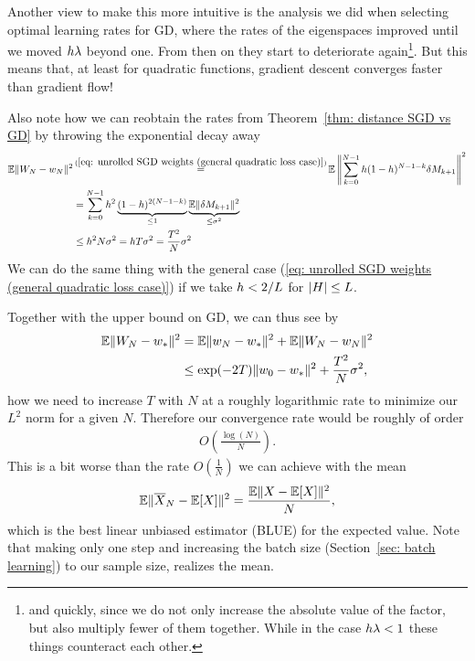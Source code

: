 Another view to make this more intuitive is the analysis we did when selecting
optimal learning rates for GD, where the rates of the eigenspaces improved until
we moved \(h\lambda\) beyond one. From then on they start to deteriorate
again\footnote{
	and quickly, since we
	do not only increase the absolute value of the factor, but also multiply fewer 
	of them together. While in the case \(h\lambda<1\) these things
	counteract each other.
}.
But this means that, at least for quadratic functions, gradient descent
converges faster than gradient flow!

Also note how we can reobtain the rates from Theorem~\ref{thm: distance
SGD vs GD} by throwing the exponential decay away
\begin{align*}
	\E\|\Weights_N-\weights_N\|^2
	&\xeq{(\ref{eq: unrolled SGD weights (general quadratic loss case)})} \E\left\|\sum_{k=0}^{N-1}\lr(1-\lr)^{N-1-k}\martIncr_{k+1}\right\|^2\\
	&= \sum_{k=0}^{N-1}\lr^2\underbrace{(1-\lr)^{2(N-1-k)}}_{\le1}
	\underbrace{\E\|\martIncr_{k+1}\|^2}_{\le \stdBound^2}\\
	&\le \lr^2 N \stdBound^2 = \lr T\stdBound^2 = \frac{T^2}{N}\stdBound^2
\end{align*}
We can do the same thing with the general case (\ref{eq: unrolled SGD weights
(general quadratic loss case)}) if we take \(h<2/L\) for \(|H|\le L\).

Together with the upper bound on GD, we can thus see by
\begin{align*}
	\mathbb{E}\|W_N - w_*\|^2
	&= \mathbb{E}\|w_N - w_*\|^2 + \mathbb{E}\|W_N - w_N\|^2\\
	&\le \exp(-2T)\|w_0 - w_*\|^2 + \frac{T^2}{N}\sigma^2,
\end{align*}
how we need to increase \(T\) with \(N\) at a roughly logarithmic rate to
minimize our \(L^2\) norm for a given \(N\). Therefore our convergence rate
would be roughly of order
\begin{align*}
	O(\tfrac{\log(N)}N).
\end{align*}
This is a bit worse than the rate \(O(\frac1N)\) we can achieve with the mean
\begin{align*}
	\mathbb{E}\|\overline{X}_N - \mathbb{E}[X]\|^2 = \frac{\mathbb{E}\|X-\mathbb{E}[X]\|^2}{N},
\end{align*}
which is the best linear unbiased estimator (BLUE) for the expected value.
Note that making only one step and increasing the batch size (Section~\ref{sec:
batch learning}) to our sample size, realizes the mean. 

